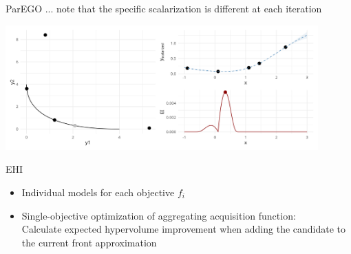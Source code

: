 \documentclass[11pt,compress,t,notes=noshow, xcolor=table]{beamer}
\begin{document}
\begin{vbframe}{ParEGO}
\framebreak
... note that the specific scalarization is different at each iteration
\begin{center}
  \includegraphics[width = 0.9\textwidth]{figure_man/multicrit_3.png}
\end{center}

\end{vbframe}

\begin{frame}{EHI}

\begin{itemize}
  \item Individual models for each objective $f_i$
  \item Single-objective optimization of aggregating acquisition function: \\
  Calculate expected hypervolume improvement when adding the candidate to the current front approximation
\end{itemize}

\end{frame}
\end{document}
